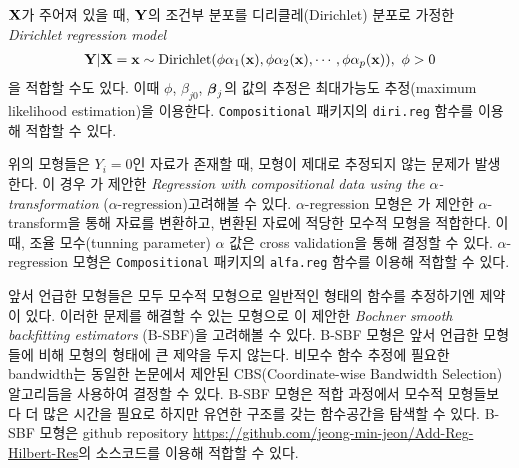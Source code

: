 $\mathbf{X}$가 주어져 있을 때, $\mathbf{Y}$의 조건부 분포를 디리클레(Dirichlet) 분포로 가정한 \textit{Dirichlet regression model}
\begin{equation}\label{eqn:dirireg}
    \begin{gathered}
        \mathbf{Y}|\mathbf{X}=\mathbf{x} \sim \text{Dirichlet}(\phi \alpha_1(\mathbf{x}), \phi \alpha_2(\mathbf{x}),\cdots, \phi \alpha_p(\mathbf{x})),~\phi > 0
    \end{gathered}
\end{equation}
을 적합할 수도 있다. 이때 $\phi$, $\beta_{j0}$, $\boldsymbol{\beta}_j$의 값의 추정은 최대가능도 추정(maximum likelihood estimation)을 이용한다. \texttt{Compositional} 패키지의 \texttt{diri.reg} 함수를 이용해 적합할 수 있다.

위의 모형들은 $Y_i=0$인 자료가 존재할 때, 모형이 제대로 추정되지 않는 문제가 발생한다. 이 경우 \citet{tsagris2015regression}가 제안한 \textit{Regression with compositional data using the $\alpha$-transformation} ($\alpha$-regression)\를 고려해볼 수 있다. $\alpha$-regression 모형은 \citet{tsagris2011data}가 제안한 $\alpha$-transform을 통해 자료를 변환하고, 변환된 자료에 적당한 모수적 모형을 적합한다. 이때, 조율 모수(tunning parameter) $\alpha$ 값은 cross validation을 통해 결정할 수 있다. $\alpha$-regression 모형은 \texttt{Compositional} 패키지의 \texttt{alfa.reg} 함수를 이용해 적합할 수 있다.

앞서 언급한 모형들은 모두 모수적 모형으로 일반적인 형태의 함수를 추정하기엔 제약이 있다. 이러한 문제를 해결할 수 있는 모형으로 \citet{jeon2018additive}이 제안한 \textit{Bochner smooth backfitting estimators} (B-SBF)을 고려해볼 수 있다. B-SBF 모형은 앞서 언급한 모형들에 비해 모형의 형태에 큰 제약을 두지 않는다. 비모수 함수 추정에 필요한 bandwidth는 동일한 논문에서 제안된 CBS(Coordinate-wise Bandwidth Selection) 알고리듬을 사용하여 결정할 수 있다. B-SBF 모형은 적합 과정에서 모수적 모형들보다 더 많은 시간을 필요로 하지만 유연한 구조를 갖는 함수공간을 탐색할 수 있다. B-SBF 모형은 github repository \url{https://github.com/jeong-min-jeon/Add-Reg-Hilbert-Res}의 소스코드를 이용해 적합할 수 있다.